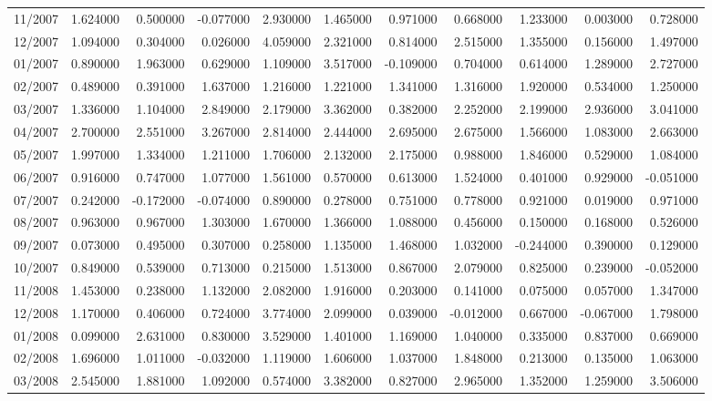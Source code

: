 \begin{tabular}{lrrrrrrrrrr}
11/2007 & 1.624000 & 0.500000 & -0.077000 & 2.930000 & 1.465000 & 0.971000 & 0.668000 & 1.233000 & 0.003000 & 0.728000 \\
12/2007 & 1.094000 & 0.304000 & 0.026000 & 4.059000 & 2.321000 & 0.814000 & 2.515000 & 1.355000 & 0.156000 & 1.497000 \\
01/2007 & 0.890000 & 1.963000 & 0.629000 & 1.109000 & 3.517000 & -0.109000 & 0.704000 & 0.614000 & 1.289000 & 2.727000 \\
02/2007 & 0.489000 & 0.391000 & 1.637000 & 1.216000 & 1.221000 & 1.341000 & 1.316000 & 1.920000 & 0.534000 & 1.250000 \\
03/2007 & 1.336000 & 1.104000 & 2.849000 & 2.179000 & 3.362000 & 0.382000 & 2.252000 & 2.199000 & 2.936000 & 3.041000 \\
04/2007 & 2.700000 & 2.551000 & 3.267000 & 2.814000 & 2.444000 & 2.695000 & 2.675000 & 1.566000 & 1.083000 & 2.663000 \\
05/2007 & 1.997000 & 1.334000 & 1.211000 & 1.706000 & 2.132000 & 2.175000 & 0.988000 & 1.846000 & 0.529000 & 1.084000 \\
06/2007 & 0.916000 & 0.747000 & 1.077000 & 1.561000 & 0.570000 & 0.613000 & 1.524000 & 0.401000 & 0.929000 & -0.051000 \\
07/2007 & 0.242000 & -0.172000 & -0.074000 & 0.890000 & 0.278000 & 0.751000 & 0.778000 & 0.921000 & 0.019000 & 0.971000 \\
08/2007 & 0.963000 & 0.967000 & 1.303000 & 1.670000 & 1.366000 & 1.088000 & 0.456000 & 0.150000 & 0.168000 & 0.526000 \\
09/2007 & 0.073000 & 0.495000 & 0.307000 & 0.258000 & 1.135000 & 1.468000 & 1.032000 & -0.244000 & 0.390000 & 0.129000 \\
10/2007 & 0.849000 & 0.539000 & 0.713000 & 0.215000 & 1.513000 & 0.867000 & 2.079000 & 0.825000 & 0.239000 & -0.052000 \\
11/2008 & 1.453000 & 0.238000 & 1.132000 & 2.082000 & 1.916000 & 0.203000 & 0.141000 & 0.075000 & 0.057000 & 1.347000 \\
12/2008 & 1.170000 & 0.406000 & 0.724000 & 3.774000 & 2.099000 & 0.039000 & -0.012000 & 0.667000 & -0.067000 & 1.798000 \\
01/2008 & 0.099000 & 2.631000 & 0.830000 & 3.529000 & 1.401000 & 1.169000 & 1.040000 & 0.335000 & 0.837000 & 0.669000 \\
02/2008 & 1.696000 & 1.011000 & -0.032000 & 1.119000 & 1.606000 & 1.037000 & 1.848000 & 0.213000 & 0.135000 & 1.063000 \\
03/2008 & 2.545000 & 1.881000 & 1.092000 & 0.574000 & 3.382000 & 0.827000 & 2.965000 & 1.352000 & 1.259000 & 3.506000 \\

\end{tabular}
